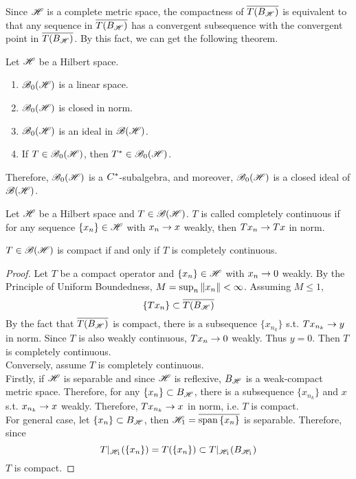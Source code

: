 \documentclass[a4paper,11pt]{report}
\begin{document}
Since $\mathscr{H}$ is a complete metric space, the compactness of $\overline{T(B_{\mathscr{H}})}$ is equivalent to that any sequence in $\overline{T(B_{\mathscr{H}})}$ has a convergent subsequence with the convergent point in $\overline{T(B_{\mathscr{H}})}$. By this fact, we can get the following theorem.

\begin{thm}
	Let $\mathscr{H}$ be a Hilbert space.
	\begin{enumerate}[label=\arabic*)]
		\item $\mathscr{B}_{0}\mathscr{(H)}$ is a linear space.
		\item $\mathscr{B}_{0}\mathscr{(H)}$ is closed in norm.
		\item $\mathscr{B}_{0}\mathscr{(H)}$ is an ideal in $\mathscr{B(H)}$.
		\item If $T \in \mathscr{B}_{0}\mathscr{(H)}$, then $T^{*} \in \mathscr{B}_{0}\mathscr{(H)}$.
	\end{enumerate}
\end{thm}
\begin{rem}
	Therefore, $\mathscr{B}_{0}\mathscr{(H)}$ is a $C^{*}$-subalgebra, and moreover, $\mathscr{B}_{0}\mathscr{(H)}$ is a closed ideal of $\mathscr{B(H)}$.
\end{rem}

\begin{defn}
	Let $\mathscr{H}$ be a Hilbert space and $T \in \mathscr{B(H)}$. $T$ is called completely continuous if for any sequence $\{x_n\} \in \mathscr{H}$ with $x_n \rightarrow x$ weakly, then $Tx_n \rightarrow Tx$ in norm.
\end{defn}

\begin{prop}
	$T \in \mathscr{B(H)}$ is compact if and only if $T$ is completely continuous. 
\end{prop}
\begin{proof}
	Let $T$ be a compact operator and $\{x_n\} \in \mathscr{H}$ with $x_n \rightarrow 0$ weakly. By the Principle of Uniform Boundedness, $M = \sup_n{\left\lVert x_n\right\lVert} < \infty$. Assuming $M \leqslant 1$,
	\begin{equation*}
		\{Tx_n\} \subset \overline{T(B_{\mathscr{H}})}
	\end{equation*}
	By the fact that $\overline{T(B_{\mathscr{H}})}$ is compact, there is a subsequence $\{x_{n_k}\}$ s.t. $Tx_{n_k}  \rightarrow y$ in norm. Since $T$ is also weakly continuous, $Tx_n \rightarrow 0$ weakly. Thus $y = 0$. Then $T$ is completely continuous.\\
	Conversely, assume $T$ is completely continuous. \\
	Firstly, if $\mathscr{H}$ is separable and since $\mathscr{H}$ is reflexive, $B_{\mathscr{H}}$ is a weak-compact metric space. Therefore, for any $\{x_n\} \subset B_{\mathscr{H}}$, there is a subsequence $\{x_{n_k}\}$ and $x$ s.t. $x_{n_k} \rightarrow x$ weakly. Therefore, $Tx_{n_k} \rightarrow x$ in norm, i.e. $T$ is compact.\\
	For general case, let $\{x_n\} \subset B_{\mathscr{H}}$, then $\mathscr{H}_1 = \overline{\operatorname{span}{\{x_n\}}}$ is separable. Therefore, since
	\begin{equation*}
		T|_{\mathscr{H}_1}(\{x_n\}) = T(\{x_n\}) \subset T|_{\mathscr{H}_1}(B_{\mathscr{H}_1})
	\end{equation*}
	$T$ is compact.
\end{proof}
\end{document}
